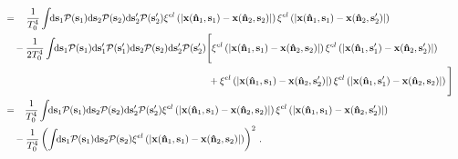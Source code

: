 \documentclass[fleqn,usenatbib]{mnras}
\begin{document}
\begin{align}
            \\
            &=
                \phantom{+}\,\frac{1}{T_0^4} \int\!\! \dif{\mbf{s}_1} \mcal{P}(\mbf{s}_1) \dif{\mbf{s}_2} \mcal{P}(\mbf{s}_2) \dif{\mbf{s}'_2} \mcal{P}(\mbf{s}'_2)
                    \xi^{el}\left(\norm{ \mbf{x}(\nhat_1,\mbf{s}_1) - \mbf{x}(\nhat_2,\mbf{s}_2) }\right)
                    \xi^{el}\left(\norm{ \mbf{x}(\nhat_1,\mbf{s}_1) - \mbf{x}(\nhat_2,\mbf{s}'_2) }\right)
                \nonumber \\ & \quad
                - \frac{1}{2 T_0^4} \int\!\! \dif{\mbf{s}_1} \mcal{P}(\mbf{s}_1) \dif{\mbf{s}'_1} \mcal{P}(\mbf{s}'_1) \dif{\mbf{s}_2} \mcal{P}(\mbf{s}_2) \dif{\mbf{s}'_2} \mcal{P}(\mbf{s}'_2)
                    \Bigg[
                    \xi^{el}\left(\norm{ \mbf{x}(\nhat_1,\mbf{s}_1) - \mbf{x}(\nhat_2,\mbf{s}_2) }\right)
                    \xi^{el}\left(\norm{ \mbf{x}(\nhat_1,\mbf{s}'_1) - \mbf{x}(\nhat_2,\mbf{s}'_2) }\right)
                     \nonumber \\ & \qquad\qquad\qquad\qquad\qquad\qquad\qquad\qquad\qquad\qquad\quad
                    +
                    \xi^{el}\left(\norm{ \mbf{x}(\nhat_1,\mbf{s}_1) - \mbf{x}(\nhat_2,\mbf{s}'_2) }\right)
                    \xi^{el}\left(\norm{ \mbf{x}(\nhat_1,\mbf{s}'_1) - \mbf{x}(\nhat_2,\mbf{s}_2) }\right)
                \Bigg] \nonumber
            \\
            &=
                \phantom{+}\frac{1}{T_0^4} \int\!\! \dif{\mbf{s}_1} \mcal{P}(\mbf{s}_1) \dif{\mbf{s}_2} \mcal{P}(\mbf{s}_2) \dif{\mbf{s}'_2} \mcal{P}(\mbf{s}'_2)
                    \xi^{el}\left(\norm{ \mbf{x}(\nhat_1,\mbf{s}_1) - \mbf{x}(\nhat_2,\mbf{s}_2) }\right)
                    \xi^{el}\left(\norm{ \mbf{x}(\nhat_1,\mbf{s}_1) - \mbf{x}(\nhat_2,\mbf{s}'_2) }\right)
                \nonumber \\ & \quad
                - \frac{1}{T_0^4} \left( \int\!\! \dif{\mbf{s}_1} \mcal{P}(\mbf{s}_1) \dif{\mbf{s}_2} \mcal{P}(\mbf{s}_2)
                    \xi^{el}\left(\norm{ \mbf{x}(\nhat_1,\mbf{s}_1) - \mbf{x}(\nhat_2,\mbf{s}_2) }\right)
                    \right)^2 \,.
                \nonumber
    \end{align}



\label{lastpage}
\end{document}
